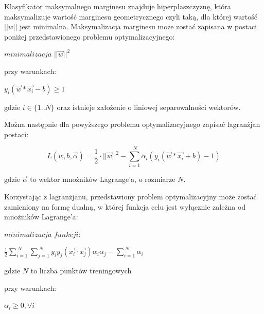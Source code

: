 \documentclass[[10pt,a4paper]{article}
\begin{document}
\vspace{5mm}Klasyfikator maksymalnego marginesu znajduje hiperpłaszczyznę, która maksymalizuje wartość marginesu geometrycznego czyli taką, dla której wartość  $||w||$ jest minimalna. 
Maksymalizacja marginesu może zostać zapisana w postaci poniżej przedstawionego problemu optymalizacyjnego:

\vspace{5mm}\centerline {$minimalizacja$  $||\overrightarrow{w}||^2$}

\vspace{5mm} przy warunkach:

\vspace{5mm}\centerline {$y_i(\overrightarrow{w}*\overrightarrow{x_i} - b)\geq 1$}

\vspace{5mm}gdzie $i \in \{1..N\}$ oraz istnieje założenie o liniowej separowalności wektorów.

\vspace{5mm}Można następnie dla powyższego problemu optymalizacyjnego zapisać lagranżjan postaci:

\vspace{5mm}
\begin{equation}
L(w,b,\overrightarrow{\alpha}) = \frac{1}{2}\cdot||\overrightarrow{w}||^2 - \sum_{i=1}^{\ N} \alpha_i(y_i(\overrightarrow{w}* \overrightarrow{x_i} +b)-1) 
\end{equation} 

\vspace{5mm} gdzie $\overrightarrow{\alpha}$ to wektor mnożników Lagrange'a, o rozmiarze $N$.

\vspace{5mm} Korzystając z lagranżjanu, przedstawiony problem optymalizacyjny może zostać zamieniony na formę dualną, w której funkcja celu jest wyłącznie zależna od mnożników Lagrange'a:

\vspace{5mm}\centerline {$minimalizacja$  $funkcji:$}

\vspace{5mm}\centerline {$\frac{1}{2} \sum_{i=1}^{\ N} \sum_{j=1}^{\ N} y_i y_j (\overrightarrow{x_i}\cdot\overrightarrow{x_j}) \alpha_i \alpha_j - \sum_{i=1}^{\ N} \alpha_i$}
  
\vspace{5mm} gdzie $N$ to liczba punktów treningowych

\vspace{5mm} przy warunkach:

\vspace{5mm}\centerline {$\alpha_i \geq 0, \forall i$ }
\end{document}
